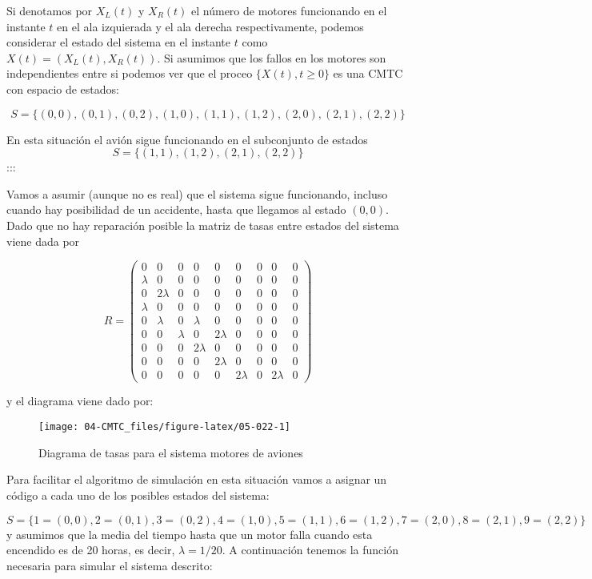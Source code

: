 \documentclass[
]{book}
\theoremstyle{definition}
\theoremstyle{definition}
\theoremstyle{definition}
\theoremstyle{definition}
\theoremstyle{remark}
\begin{document}
Si denotamos por \(X_L(t)\) y \(X_R(t)\) el número de motores funcionando en el instante \(t\) en el ala izquierada y el ala derecha respectivamente, podemos considerar el estado del sistema en el instante \(t\) como \(X(t) = (X_L(t), X_R(t))\). Si asumimos que los fallos en los motores son independientes entre si podemos ver que el proceo \(\{X(t), t \geq 0\}\) es una CMTC con espacio de estados:

\[S = \{ (0, 0), (0, 1), (0, 2), (1, 0), (1, 1), (1, 2), (2, 0), (2, 1), (2,2) \}\]

En esta situación el avión sigue funcionando en el subconjunto de estados \[S = \{ (1, 1), (1, 2), (2, 1), (2,2) \}\]
:::

Vamos a asumir (aunque no es real) que el sistema sigue funcionando, incluso cuando hay posibilidad de un accidente, hasta que llegamos al estado \((0, 0)\). Dado que no hay reparación posible la matriz de tasas entre estados del sistema viene dada por

\[R = 
\begin{pmatrix}
0 & 0 & 0 & 0 & 0 & 0 & 0 & 0 & 0 \\
\lambda & 0 & 0 & 0 & 0 & 0 & 0 & 0 & 0 \\
0 & 2\lambda & 0 & 0 & 0 & 0 & 0 & 0 & 0 \\
\lambda & 0 & 0 & 0 & 0 & 0 & 0 & 0 & 0 \\
0 & \lambda & 0 & \lambda & 0 & 0 & 0 & 0 & 0 \\
0 & 0 & \lambda & 0 & 2\lambda & 0 & 0 & 0 & 0 \\
0 & 0 & 0 & 2\lambda & 0 & 0 & 0 & 0 & 0 \\
0 & 0 & 0 & 0 & 2\lambda & 0 & 0 & 0 & 0 \\
0 & 0 & 0 & 0 & 0 & 2\lambda & 0 & 2\lambda & 0
\end{pmatrix} \]

y el diagrama viene dado por:

\begin{figure}

{\centering \texttt{[image: 04-CMTC\_files/figure-latex/05-022-1]} 

}

\caption{Diagrama de tasas para el sistema motores de aviones}\label{fig:05-022}
\end{figure}

Para facilitar el algoritmo de simulación en esta situación vamos a asignar un código a cada uno de los posibles estados del sistema:

\[S = \{ 1 = (0, 0), 2 = (0, 1), 3 = (0, 2), 4 = (1, 0), 5 = (1, 1), 6 = (1, 2), 7 = (2, 0), 8 = (2, 1), 9 = (2,2) \}\]
y asumimos que la media del tiempo hasta que un motor falla cuando esta encendido es de 20 horas, es decir, \(\lambda = 1/20\). A continuación tenemos la función necesaria para simular el sistema descrito:
\end{document}
